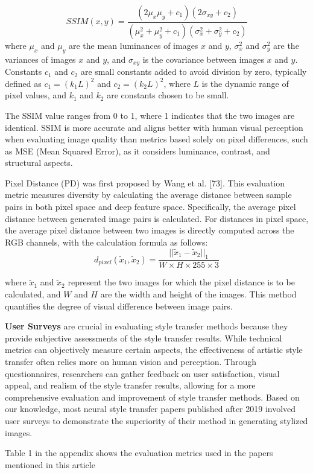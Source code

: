 \begin{equation}
    SSIM(x, y) = \frac{(2\mu_x\mu_y + c_1)(2\sigma_{xy} + c_2)}{(\mu_x^2 + \mu_y^2 + c_1)(\sigma_x^2 + \sigma_y^2 + c_2)}
\end{equation}
where $\mu_x$ and $\mu_y$ are the mean luminances of images $x$ and $y$, $\sigma_x^2$ and $\sigma_y^2$ are the variances of images $x$ and $y$, and $\sigma_{xy}$ is the covariance between images $x$ and $y$. Constants $c_1$ and $c_2$ are small constants added to avoid division by zero, typically defined as $c_1=(k_1 L)^2$ and $c_2=(k_2 L)^2$, where $L$ is the dynamic range of pixel values, and $k_1$ and $k_2$ are constants chosen to be small.

The SSIM value ranges from 0 to 1, where 1 indicates that the two images are identical. SSIM is more accurate and aligns better with human visual perception when evaluating image quality than metrics based solely on pixel differences, such as MSE (Mean Squared Error), as it considers luminance, contrast, and structural aspects.

\textbf{}{Pixel Distance (PD)} was first proposed by Wang et al. [73]. This evaluation metric measures diversity by calculating the average distance between sample pairs in both pixel space and deep feature space. Specifically, the average pixel distance between generated image pairs is calculated. For distances in pixel space, the average pixel distance between two images is directly computed across the RGB channels, with the calculation formula as follows:
\begin{equation}
    d_{pixel}(\tilde{x}_1, \tilde{x}_2) = \frac{||\tilde{x}_1 - \tilde{x}_2||_1}{W \times H \times 255 \times 3}
\end{equation}

where $\tilde{x}_1$ and $\tilde{x}_2$ represent the two images for which the pixel distance is to be calculated, and $W$ and $H$ are the width and height of the images. This method quantifies the degree of visual difference between image pairs.

\textbf{User Surveys} are crucial in evaluating style transfer methods because they provide subjective assessments of the style transfer results. While technical metrics can objectively measure certain aspects, the effectiveness of artistic style transfer often relies more on human vision and perception. Through questionnaires, researchers can gather feedback on user satisfaction, visual appeal, and realism of the style transfer results, allowing for a more comprehensive evaluation and improvement of style transfer methods. Based on our knowledge, most neural style transfer papers published after 2019 involved user surveys to demonstrate the superiority of their method in generating stylized images.

Table 1 in the appendix shows the evaluation metrics used in the papers mentioned in this article
